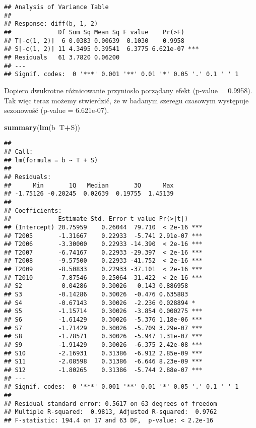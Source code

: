 \documentclass[polish,]{book}
\newenvironment{Shaded}{\begin{snugshade}}{\end{snugshade}}
\newcommand{\KeywordTok}[1]{\textcolor[rgb]{0.13,0.29,0.53}{\textbf{#1}}}
\newcommand{\NormalTok}[1]{#1}
\newcommand{\OperatorTok}[1]{\textcolor[rgb]{0.81,0.36,0.00}{\textbf{#1}}}
\begin{document}
\begin{verbatim}
## Analysis of Variance Table
## 
## Response: diff(b, 1, 2)
##             Df Sum Sq Mean Sq F value    Pr(>F)    
## T[-c(1, 2)]  6 0.0383 0.00639  0.1030    0.9958    
## S[-c(1, 2)] 11 4.3495 0.39541  6.3775 6.621e-07 ***
## Residuals   61 3.7820 0.06200                      
## ---
## Signif. codes:  0 '***' 0.001 '**' 0.01 '*' 0.05 '.' 0.1 ' ' 1
\end{verbatim}

Dopiero dwukrotne różnicowanie przyniosło porządany efekt (p-value = 0.9958). Tak
więc teraz możemy stwierdzić, że w badanym szeregu czasowym występuje sezonowość (p-value = 6.621e-07).

\begin{Shaded}
\begin{Highlighting}[]
\KeywordTok{summary}\NormalTok{(}\KeywordTok{lm}\NormalTok{(b}\OperatorTok{~}\NormalTok{T}\OperatorTok{+}\NormalTok{S))}
\end{Highlighting}
\end{Shaded}

\begin{verbatim}
## 
## Call:
## lm(formula = b ~ T + S)
## 
## Residuals:
##      Min       1Q   Median       3Q      Max 
## -1.75126 -0.20245  0.02639  0.19755  1.45139 
## 
## Coefficients:
##             Estimate Std. Error t value Pr(>|t|)    
## (Intercept) 20.75959    0.26044  79.710  < 2e-16 ***
## T2005       -1.31667    0.22933  -5.741 2.91e-07 ***
## T2006       -3.30000    0.22933 -14.390  < 2e-16 ***
## T2007       -6.74167    0.22933 -29.397  < 2e-16 ***
## T2008       -9.57500    0.22933 -41.752  < 2e-16 ***
## T2009       -8.50833    0.22933 -37.101  < 2e-16 ***
## T2010       -7.87546    0.25064 -31.422  < 2e-16 ***
## S2           0.04286    0.30026   0.143 0.886958    
## S3          -0.14286    0.30026  -0.476 0.635883    
## S4          -0.67143    0.30026  -2.236 0.028894 *  
## S5          -1.15714    0.30026  -3.854 0.000275 ***
## S6          -1.61429    0.30026  -5.376 1.18e-06 ***
## S7          -1.71429    0.30026  -5.709 3.29e-07 ***
## S8          -1.78571    0.30026  -5.947 1.31e-07 ***
## S9          -1.91429    0.30026  -6.375 2.42e-08 ***
## S10         -2.16931    0.31386  -6.912 2.85e-09 ***
## S11         -2.08598    0.31386  -6.646 8.23e-09 ***
## S12         -1.80265    0.31386  -5.744 2.88e-07 ***
## ---
## Signif. codes:  0 '***' 0.001 '**' 0.01 '*' 0.05 '.' 0.1 ' ' 1
## 
## Residual standard error: 0.5617 on 63 degrees of freedom
## Multiple R-squared:  0.9813, Adjusted R-squared:  0.9762 
## F-statistic: 194.4 on 17 and 63 DF,  p-value: < 2.2e-16
\end{verbatim}
\end{document}
